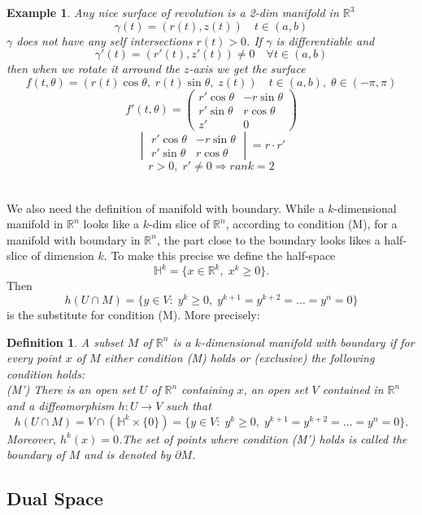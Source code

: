 \documentclass[11pt]{article}
\def\RR{\mathbb{R}}
\newtheorem{definition}{Definition}[section]
\newtheorem{example}{Example}[section]
\begin{document}
\begin{example}
Any nice surface of revolution is a 2-dim manifold in $\RR^3$ 
\[\gamma(t) = (r(t), z(t)) \quad t \in (a,b)\]
$\gamma$ does not have any self intersections $r(t)>0$. If $\gamma$ is differentiable and
\[\gamma'(t) = (r'(t) , z'(t)) \neq 0 \quad \forall t \in (a,b)\]
then when we rotate it arround the $z$-axis we get the surface
\[f(t,\theta) = (r(t)\cos\theta, \; r(t)\sin\theta, \; z(t)) \quad t \in (a,b), \; \theta \in (-\pi , \pi)\]
\[f'(t,\theta) = \begin{pmatrix} r'\cos\theta & -r\sin\theta \\ r'\sin\theta & r\cos\theta \\ z' & 0 \end{pmatrix}\]
\[\begin{vmatrix} r'\cos\theta & -r\sin\theta \\ r'\sin\theta & r\cos\theta \end{vmatrix} = r\cdot r'\]
\[r>0, \; r' \neq 0 \Rightarrow rank =2 \]
\end{example} 

\quad \\
We also need the definition of manifold with boundary. While a $k$-dimensional manifold in $\RR^n$ looks like a $k$-dim  slice of $\RR^n$, according to condition (M), for a manifold with boundary in $\RR^n$, the part close to the boundary looks likes a half-slice of dimension $k$. To make this precise we define the half-space
\[\mathbb{H}^k = \{x \in \RR^k, \;  x^k \geq 0 \}.\]
Then
\[h(U \cap M) = \{ y \in V: \; y^k \geq 0, \;y^{k+1} = y^{k+2} = \dots = y^{n} = 0\}\]
is the substitute for condition (M). More precisely:

\begin{definition} 
A subset $M$ of $\RR^n$ is a $k$-dimensional manifold with boundary if for every point $x$ of $M$ either condition (M) holds or (exclusive) the following condition holds: \\
(M') There is an open set $U$ of $\RR^n$ containing $x$, an open set $V$ contained in $\RR^n$ and a
diffeomorphism $h : U \rightarrow V$ such that
\[h(U \cap M) = V \cap (\mathbb{H}^k\times \{0\}) = \{ y \in V: \; y^k \geq 0, \;y^{k+1} = y^{k+2} = \dots = y^{n} = 0\}.\]
Moreover, $h^k(x) = 0$.The set of points where condition (M') holds is called the boundary of $M$ and is denoted
by $\partial M$.
\end{definition}

\subsection{Dual Space}
\end{document}
